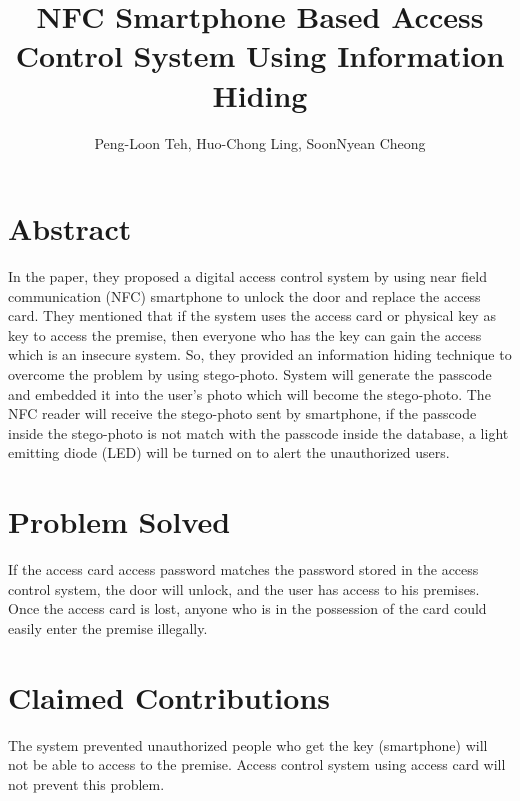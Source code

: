 \documentclass[•]{article}
\title{NFC Smartphone Based Access Control System Using Information Hiding}
\author{Peng-Loon Teh, Huo-Chong Ling, SoonNyean Cheong}
\date{}
\begin{document}

\tableofcontents
\maketitle

\section{Abstract}
\hspace{1cm}In the paper, they proposed a digital access control system by using near field communication (NFC) smartphone to unlock the door and replace the access card. They mentioned that if the system uses the access card or physical key as key to access the premise, then everyone who has the key can gain the access which is an insecure system. So, they provided an information hiding technique to overcome the problem by using stego-photo. System will generate the passcode and embedded it into the user’s photo which will become the stego-photo. The NFC reader will receive the stego-photo sent by smartphone, if the passcode inside the stego-photo is not match with the passcode inside the database, a light emitting diode (LED) will be turned on to alert the unauthorized users. 

\section{Problem Solved}
\hspace{1cm}If the access card access password matches the password stored in the access control system, the door will unlock, and the user has access to his premises.
Once the access card is lost, anyone who is in the possession of the card could easily enter the premise illegally.

\section{Claimed Contributions}
\hspace{1cm}The system prevented unauthorized people who get the key (smartphone) will not be able to access to the premise. Access control system using access card will not prevent this problem.
\end{document}
